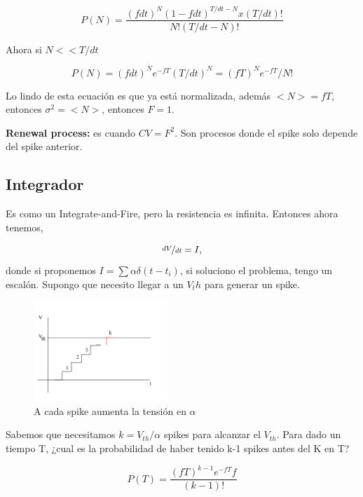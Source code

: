 \begin{equation}
	P(N) = \frac{(fdt)^N (1 - fdt)^{T/dt - N}x (T/dt)!}{N!(T/dt-N)!}
\end{equation}

Ahora si $N<<T/dt$

\begin{equation}
		P(N) = (fdt)^N e^{-fT} (T/dt)^N= (fT)^N e^{-fT}/N!
\end{equation}

Lo lindo de esta ecuación es que ya está normalizada, además $<N> = fT$, entonces $\sigma^2=<N>$, entonces $F=1$.


{\bf Renewal process:} es cuando $CV=F^2$. Son procesos donde el  spike solo depende del spike anterior.


\subsection{Integrador}

Es como  un Integrate-and-Fire, pero la resistencia es infinita. Entonces ahora tenemos,

\begin{equation}
	\nicefrac{dV}{dt}= I,
\end{equation}
donde si proponemos $I=\sum \alpha \delta(t-t_i)$, si soluciono el problema, tengo un escalón. Supongo que necesito llegar a un $V_th$ para generar un spike. 

\begin{figure}[H]
	\centering
	\includegraphics[width=0.45\textwidth]{2-2.png}
	\caption{A cada spike aumenta la tensión en $\alpha$}
\end{figure}

Sabemos que necesitamos $k=V_{th}/\alpha$ spikes para alcanzar el $V_{th}$. Para dado un tiempo T, ¿cual es la probabilidad de haber tenido k-1 spikes antes del K en T?

\begin{equation}
	P(T)=\frac{(fT)^{k-1} e^{-fT}f}{(k-1)!}
\end{equation}

